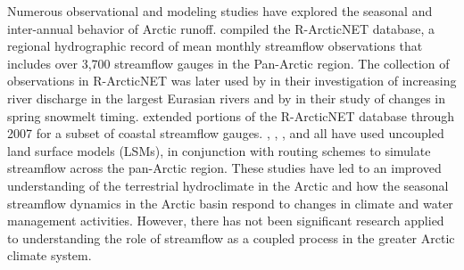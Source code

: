 \documentclass[jgrga, draft]{agutex}
\begin{document}
\begin{article}
Numerous observational and modeling studies have explored the seasonal and inter-annual behavior of Arctic runoff. %
\citet{Lammers_2001} compiled the R-ArcticNET database, a regional hydrographic record of mean monthly streamflow observations that includes over 3,700 streamflow gauges in the Pan-Arctic region.
The collection of observations in R-ArcticNET was later used by \citet{Shiklomanov_2009} in their investigation of increasing river discharge in the largest Eurasian rivers and by \citet{Tan_2011} in their study of changes in spring snowmelt timing.
\citet{Dai_2009} extended portions of the R-ArcticNET database through 2007 for a subset of coastal streamflow gauges.
\citet{Adam_2007}, \citet{Adam_2008}, \citet{Su_2005}, and \citet{Dai_2009} all have used uncoupled land surface models (LSMs), in conjunction with routing schemes to simulate streamflow across the pan-Arctic region.
These studies have led to an improved understanding of the terrestrial hydroclimate in the Arctic and how the seasonal streamflow dynamics in the Arctic basin respond to changes in climate and water management activities.
However, there has not been significant research applied to understanding the role of streamflow as a coupled process in the greater Arctic climate system. %


\end{article}
\end{document}
